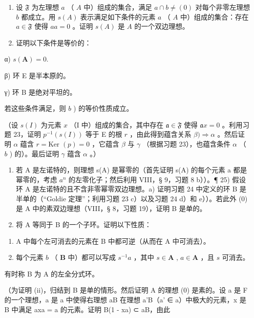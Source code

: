 \begin{enumerate}
\def\labelenumi{\alph{enumi})}
\setcounter{enumi}{2}
\item
  设 \(\mathfrak{F}\) 为左理想 \(a\) （ \(A\) 中）组成的集合，满足 \(a \cap b \neq (0)\) 对每个非零左理想 \(b\) 都成立。用 \(s(A)\) 表示满足如下条件的元素 \(a\) （ \(A\) 中）组成的集合：存在 \(a \in \mathfrak{F}\) 使得 \(aa = 0\) 。证明 \(s(A)\) 是 \(A\) 的一个双边理想。
\item
  证明以下条件是等价的：
\end{enumerate}

α) \(s(\mathbf{A}) = 0.\)

β) 环 E 是半本原的。

γ) 环 B 是绝对平坦的。

若这些条件满足，则 \(b\) ) 的等价性质成立。

（设 \(s(I)\) 为元素 \(x\) （I 中）组成的集合，其中存在 \(\mathfrak{a} \in \mathfrak{F}\) 使得 \(\mathfrak{a} x = 0\) 。利用习题 23，证明 \(p^{-1}(s(I))\) 等于 E 的根 \(r\) ，由此得到蕴含关系 \(\beta) \Rightarrow \alpha\) 。然后证明 \(\alpha\) 蕴含 \(r = \text{Ker } (p) = 0\) ，它蕴含 \(\beta\) 与 \(\gamma\) （根据习题 23），也蕴含条件 \(\alpha\) （ \(b\) ) 的）。最后证明 \(\gamma\) 蕴含 \(\alpha\) 。）

\begin{enumerate}
\def\labelenumi{\alph{enumi})}
\setcounter{enumi}{4}
\item
  若 A 是左诺特的，则理想 s(A) 是幂零的（首先证明 s(A) 的每个元素 a 都是幂零的，考虑 \(a^{n}\) 的左零化子；然后利用 VIII，§ 9，习题 8 b））。¶ 25) 假设环 A 是左诺特的且不含非零幂零双边理想。a) 证明习题 24 中定义的环 B 是半单的（“Goldie 定理”；利用习题 23 c）以及习题 24 d）和 e））。若此外 (0) 是 A 中的素双边理想（VIII，§ 8，习题 19），证明 B 是单的。
\item
  将 A 等同于 B 的一个子环。证明以下性质：
\end{enumerate}

\begin{enumerate}
\def\labelenumi{(\roman{enumi})}
\item
  A 中每个左可消去的元素在 B 中都可逆（从而在 A 中可消去）。
\item
  每个元素 \(b\) （ \(\mathbf{B}\) 中）都可以写成 \(s^{-1}a\) ，其中 \(s \in \mathbf{A}\) , \(a \in \mathbf{A}\) ，且 \(s\) 可消去。
\end{enumerate}

有时称 B 为 A 的左全分式环。

（为证明 (ii)，归结到 B 是单的情形。然后证明 A 的理想 (0) 是素的。设 a 是 F 的一个理想，a 是 a 中使得右理想 aB 在理想 a'B（a' ∈ a）中极大的元素，x 是 B 中满足 axa = a 的元素。证明 B(1 - xa) ⊂ aB，由此


